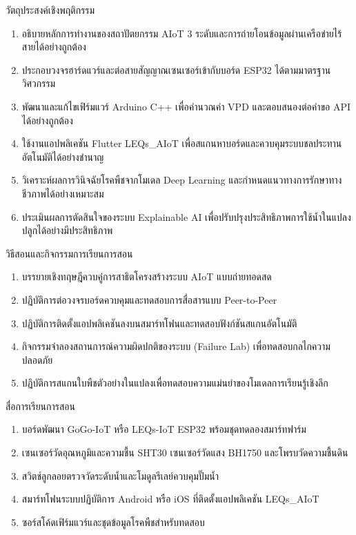 \begin{planbox}{วัตถุประสงค์เชิงพฤติกรรม}
\begin{enumerate}[topsep=2pt, itemsep=1pt, partopsep=0pt, parsep=0pt, leftmargin=1.5em]
    \item อธิบายหลักการทำงานของสถาปัตยกรรม AIoT 3 ระดับและการถ่ายโอนข้อมูลผ่านเครือข่ายไร้สายได้อย่างถูกต้อง
    \item ประกอบวงจรฮาร์ดแวร์และต่อสายสัญญาณเซนเซอร์เข้ากับบอร์ด ESP32 ได้ตามมาตรฐานวิศวกรรม
    \item พัฒนาและแก้ไขเฟิร์มแวร์ Arduino C++ เพื่อคำนวณค่า VPD และตอบสนองต่อคำขอ API ได้อย่างถูกต้อง
    \item ใช้งานแอปพลิเคชัน Flutter LEQs\_AIoT เพื่อสแกนหาบอร์ดและควบคุมระบบชลประทานอัตโนมัติได้อย่างชำนาญ
    \item วิเคราะห์ผลการวินิจฉัยโรคพืชจากโมเดล Deep Learning และกำหนดแนวทางการรักษาทางชีวภาพได้อย่างเหมาะสม
    \item ประเมินผลการตัดสินใจของระบบ Explainable AI เพื่อปรับปรุงประสิทธิภาพการใช้น้ำในแปลงปลูกได้อย่างมีประสิทธิภาพ
\end{enumerate}
\end{planbox}

\newpage

\begin{planbox}{วิธีสอนและกิจกรรมการเรียนการสอน}
\begin{enumerate}[topsep=2pt, itemsep=1pt, partopsep=0pt, parsep=0pt, leftmargin=1.5em]
    \item บรรยายเชิงทฤษฎีควบคู่การสาธิตโครงสร้างระบบ AIoT แบบถ่ายทอดสด
    \item ปฏิบัติการต่อวงจรบอร์ดควบคุมและทดสอบการสื่อสารแบบ Peer-to-Peer
    \item ปฏิบัติการติดตั้งแอปพลิเคชันลงบนสมาร์ทโฟนและทดสอบฟังก์ชันสแกนอัตโนมัติ
    \item กิจกรรมจำลองสถานการณ์ความผิดปกติของระบบ (Failure Lab) เพื่อทดสอบกลไกความปลอดภัย
    \item ปฏิบัติการสแกนใบพืชตัวอย่างในแปลงเพื่อทดสอบความแม่นยำของโมเดลการเรียนรู้เชิงลึก
\end{enumerate}
\end{planbox}

\begin{planbox}{สื่อการเรียนการสอน}
\begin{enumerate}[topsep=2pt, itemsep=1pt, partopsep=0pt, parsep=0pt, leftmargin=1.5em]
    \item บอร์ดพัฒนา GoGo-IoT หรือ LEQs-IoT ESP32 พร้อมชุดทดลองสมาร์ทฟาร์ม
    \item เซนเซอร์วัดอุณหภูมิและความชื้น SHT30 เซนเซอร์วัดแสง BH1750 และโพรบวัดความชื้นดิน
    \item สวิตช์ลูกลอยตรวจวัดระดับน้ำและโมดูลรีเลย์ควบคุมปั๊มน้ำ
    \item สมาร์ทโฟนระบบปฏิบัติการ Android หรือ iOS ที่ติดตั้งแอปพลิเคชัน LEQs\_AIoT
    \item ซอร์สโค้ดเฟิร์มแวร์และชุดข้อมูลโรคพืชสำหรับทดสอบ
\end{enumerate}
\end{planbox}

